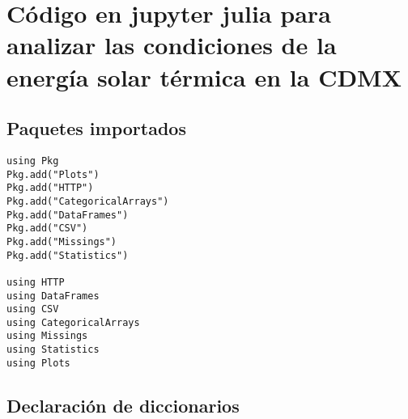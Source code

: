\chapter{Código en jupyter julia para analizar las condiciones de la energía solar térmica en la CDMX}
\label{ch:solar-irradiation-code}

\section*{Paquetes importados}

\begin{lstlisting}
using Pkg
Pkg.add("Plots")
Pkg.add("HTTP")
Pkg.add("CategoricalArrays")
Pkg.add("DataFrames")
Pkg.add("CSV")
Pkg.add("Missings")
Pkg.add("Statistics")

using HTTP
using DataFrames
using CSV
using CategoricalArrays
using Missings
using Statistics
using Plots
\end{lstlisting}

\section*{Declaración de diccionarios}

